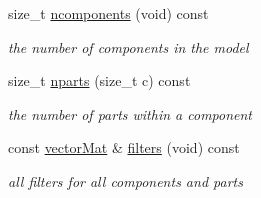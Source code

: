 \begin{DoxyCompactItemize}
size\+\_\+t \hyperlink{classParts_a88ecd6a5e7e745e89c53f95f1593c600}{ncomponents} (void) const 
\begin{DoxyCompactList}\small\item\em the number of components in the model \end{DoxyCompactList}\item 
size\+\_\+t \hyperlink{classParts_a77d8b38212220cd8779736205388b48f}{nparts} (size\+\_\+t c) const 
\begin{DoxyCompactList}\small\item\em the number of parts within a component \end{DoxyCompactList}\item 
const \hyperlink{types_8hpp_a3207a7addcfa415d1c83622febcb1e9b}{vector\+Mat} \& \hyperlink{classParts_af3e4755656bcd59221ec3b91a79c0201}{filters} (void) const 
\begin{DoxyCompactList}\small\item\em all filters for all components and parts \end{DoxyCompactList}\end{DoxyCompactItemize}
